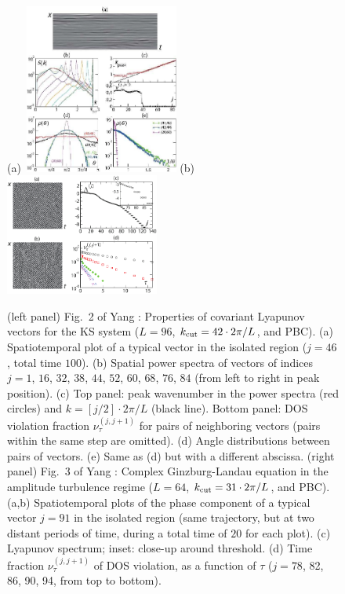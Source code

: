 \begin{description}
\begin{figure}
 (a)~\includegraphics[width=0.45\textwidth]{../figs/YaTaGiChRa08fig2}
 (b)~\includegraphics[width=0.45\textwidth]{../figs/YaTaGiChRa08fig3}
\caption{
(left panel)
Fig.~2 of Yang \etal{}:
Properties of covariant Lyapunov vectors for the KS system
($L = 96$, $k_{\rm cut} = 42 \cdot 2\pi/L$, and PBC).
(a) Spatiotemporal plot of a typical vector in the isolated region
($j=46$, total time $100$).
(b) Spatial power spectra of vectors of indices
$j = 1$, $16$, $32$, $38$, $44$, $52$, $60$, $68$, $76$, $84$
(from left to right in peak position).
(c) Top panel: peak wavenumber in the power spectra (red circles)
and $k = [j/2] \cdot 2\pi/L$ (black line).
Bottom panel: DOS violation fraction $\nu^{(j,j+1)}_\tau$ for pairs of
neighboring vectors (pairs within the same step are omitted).
(d) Angle distributions between pairs of vectors.
(e) Same as (d) but with a different abscissa.
(right panel)
Fig.~3 of Yang \etal{}:
Complex Ginzburg-Landau equation in the amplitude turbulence regime
($L = 64$, $k_{\rm cut} = 31 \cdot 2\pi/L$, and PBC).
(a,b) Spatiotemporal plots of the phase component of a typical vector $j = 91$ in the isolated region
(same trajectory, but at two distant periods of time, during a total time of $20$ for each plot).
(c) Lyapunov spectrum; inset: close-up around threshold.
(d) Time fraction $\nu^{(j,j+1)}_\tau$ of DOS violation, as a function of $\tau$
($j=78$, 82, 86, 90, 94, from top to bottom).
}
\label{fig:lyapSpecCLG}
\end{figure}




\end{description}
